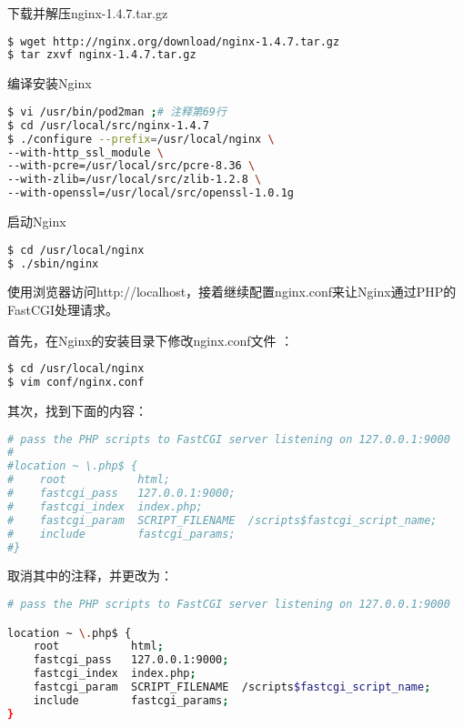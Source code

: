 下载并解压nginx-1.4.7.tar.gz


\begin{lstlisting}[language=bash]
$ wget http://nginx.org/download/nginx-1.4.7.tar.gz
$ tar zxvf nginx-1.4.7.tar.gz
\end{lstlisting}


编译安装Nginx


\begin{lstlisting}[language=bash]
$ vi /usr/bin/pod2man ;# 注释第69行
$ cd /usr/local/src/nginx-1.4.7
$ ./configure --prefix=/usr/local/nginx \
--with-http_ssl_module \
--with-pcre=/usr/local/src/pcre-8.36 \
--with-zlib=/usr/local/src/zlib-1.2.8 \
--with-openssl=/usr/local/src/openssl-1.0.1g
\end{lstlisting}

启动Nginx

\begin{lstlisting}[language=bash]
$ cd /usr/local/nginx
$ ./sbin/nginx
\end{lstlisting}

使用浏览器访问http://localhost，接着继续配置nginx.conf来让Nginx通过PHP的FastCGI处理请求。

首先，在Nginx的安装目录下修改nginx.conf文件	：


\begin{lstlisting}[language=bash]
$ cd /usr/local/nginx
$ vim conf/nginx.conf
\end{lstlisting}

其次，找到下面的内容：


\begin{lstlisting}[language=bash]
# pass the PHP scripts to FastCGI server listening on 127.0.0.1:9000
#
#location ~ \.php$ {
#    root           html;
#    fastcgi_pass   127.0.0.1:9000;
#    fastcgi_index  index.php;
#    fastcgi_param  SCRIPT_FILENAME  /scripts$fastcgi_script_name;
#    include        fastcgi_params;
#}
\end{lstlisting}


取消其中的注释，并更改为：

\begin{lstlisting}[language=bash]
# pass the PHP scripts to FastCGI server listening on 127.0.0.1:9000

location ~ \.php$ {
    root           html;
    fastcgi_pass   127.0.0.1:9000;
    fastcgi_index  index.php;
    fastcgi_param  SCRIPT_FILENAME  /scripts$fastcgi_script_name;
    include        fastcgi_params;
}
\end{lstlisting}

